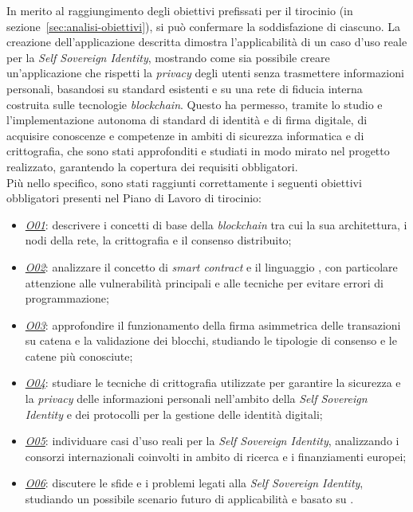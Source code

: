 In merito al raggiungimento degli obiettivi prefissati per il tirocinio (in sezione~\ref{sec:analisi-obiettivi}),
si può confermare la soddisfazione di ciascuno. La creazione dell'applicazione descritta dimostra l'applicabilità di un caso d'uso reale per la \textit{Self Sovereign Identity},
mostrando come sia possibile creare un'applicazione che rispetti la \textit{privacy} degli utenti senza trasmettere informazioni personali, basandosi su standard esistenti e su una rete di fiducia interna costruita sulle tecnologie \textit{blockchain}.
Questo ha permesso, tramite lo studio e l'implementazione autonoma di standard di identità e di firma digitale, di 
acquisire conoscenze e competenze in ambiti di sicurezza informatica e di crittografia, che sono stati approfonditi e studiati
in modo mirato nel progetto realizzato, garantendo la copertura dei requisiti obbligatori. \\

\clearpage
Più nello specifico, sono stati raggiunti correttamente i seguenti obiettivi obbligatori presenti nel Piano di Lavoro di tirocinio:
\begin{itemize}
    \item \underline{\textit{O01}}: descrivere i concetti di base della \textit{blockchain} tra cui la sua architettura, i nodi della rete, la crittografia e il consenso distribuito;
    \item \underline{\textit{O02}}: analizzare il concetto di \textit{smart contract} e il linguaggio , con particolare attenzione alle vulnerabilità principali e alle tecniche per evitare errori di programmazione;
    \item \underline{\textit{O03}}: approfondire il funzionamento della firma asimmetrica delle transazioni su catena e la validazione dei blocchi, studiando le tipologie di consenso e le catene più conosciute;
    \item \underline{\textit{O04}}: studiare le tecniche di crittografia utilizzate per garantire la sicurezza e la \textit{privacy} delle informazioni personali nell'ambito della \textit{Self Sovereign Identity} e dei protocolli per la gestione delle identità digitali;
    \item \underline{\textit{O05}}: individuare casi d'uso reali per la \textit{Self Sovereign Identity}, analizzando i consorzi internazionali coinvolti in ambito di ricerca e i finanziamenti europei;
    \item \underline{\textit{O06}}: discutere le sfide e i problemi legati alla \textit{Self Sovereign Identity}, studiando un possibile scenario futuro di applicabilità e basato su .
\end{itemize}


